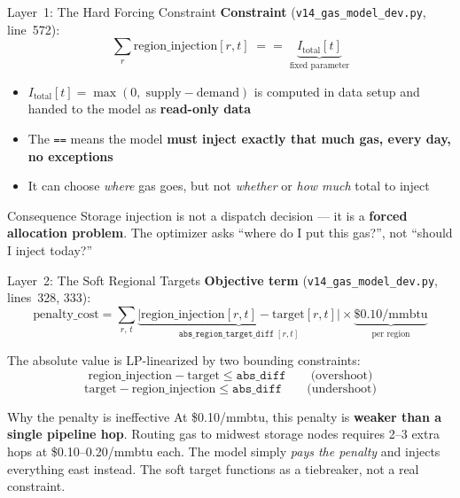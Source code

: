 \documentclass[aspectratio=169, 11pt]{beamer}
\begin{document}
\begin{frame}{Layer~1: The Hard Forcing Constraint}
  \textbf{Constraint} (\texttt{v14\_gas\_model\_dev.py}, line~572):
  \[
    \sum_{r} \text{region\_injection}[r,t] \;==\; \underbrace{I_\text{total}[t]}_{\text{fixed parameter}}
  \]

  \begin{itemize}
    \item $I_\text{total}[t] = \max(0,\;\text{supply} - \text{demand})$ is computed in data setup and handed to the model as \textbf{read-only data}
    \item The \texttt{==} means the model \textbf{must inject exactly that much gas, every day, no exceptions}
    \item It can choose \emph{where} gas goes, but not \emph{whether} or \emph{how much} total to inject
  \end{itemize}

  \vspace{0.5em}
  \begin{block}{Consequence}
    Storage injection is not a dispatch decision --- it is a \textbf{forced allocation problem}.
    The optimizer asks ``where do I put this gas?'', not ``should I inject today?''
  \end{block}
\end{frame}

\begin{frame}{Layer~2: The Soft Regional Targets}
  \textbf{Objective term} (\texttt{v14\_gas\_model\_dev.py}, lines~328, 333):
  \[
    \text{penalty\_cost} = \sum_{r,\,t} \underbrace{|\text{region\_injection}[r,t] - \text{target}[r,t]|}_{\texttt{abs\_region\_target\_diff}\;[r,t]}
    \times \underbrace{\$0.10/\text{mmbtu}}_{\text{per region}}
  \]

  The absolute value is LP-linearized by two bounding constraints:
  \[
    \text{region\_injection} - \text{target} \leq \texttt{abs\_diff} \qquad \text{(overshoot)}
  \]
  \[
    \text{target} - \text{region\_injection} \leq \texttt{abs\_diff} \qquad \text{(undershoot)}
  \]

  \vspace{0.3em}
  \begin{alertblock}{Why the penalty is ineffective}
    At \$0.10/mmbtu, this penalty is \textbf{weaker than a single pipeline hop}.
    Routing gas to midwest storage nodes requires 2--3 extra hops at \$0.10--0.20/mmbtu each.
    The model simply \emph{pays the penalty} and injects everything east instead.
    The soft target functions as a tiebreaker, not a real constraint.
  \end{alertblock}
\end{frame}
\end{document}
